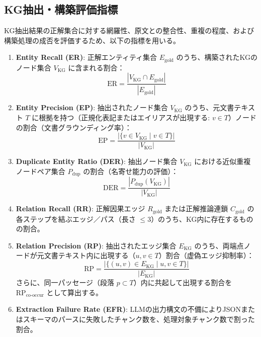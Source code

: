 \documentclass[a4j,dvipdfmx]{jsarticle}
\begin{document}
\subsection{KG抽出・構築評価指標}
KG抽出結果の正解集合に対する網羅性、原文との整合性、重複の程度、および構築処理の成否を評価するため、以下の指標を用いる。
\begin{enumerate}
    \item \textbf{Entity Recall (ER)}: 正解エンティティ集合 $E_{\text{gold}}$ のうち、構築されたKGのノード集合 $V_{\text{KG}}$ に含まれる割合：
    \begin{equation}
        \text{ER} = \frac{|V_{\text{KG}} \cap E_{\text{gold}}|}{|E_{\text{gold}}|}
    \end{equation}
    \item \textbf{Entity Precision (EP)}: 抽出されたノード集合 $V_{\text{KG}}$ のうち、元文書テキスト $T$ に根拠を持つ（正規化表記またはエイリアスが出現する: $v \in T$）ノードの割合（文書グラウンディング率）：
    \begin{equation}
        \text{EP} = \frac{|\{v \in V_{\text{KG}} \mid v \in T\}|}{|V_{\text{KG}}|}
    \end{equation}
    \item \textbf{Duplicate Entity Ratio (DER)}: 抽出ノード集合 $V_{\text{KG}}$ における近似重複ノードペア集合 $P_{\text{dup}}$ の割合（名寄せ能力の評価）：
    \begin{equation}
        \text{DER} = \frac{|P_{\text{dup}}(V_{\text{KG}})|}{|V_{\text{KG}}|}
    \end{equation}
    \item \textbf{Relation Recall (RR)}: 正解因果エッジ $R_{\text{gold}}$ または正解推論連鎖 $C_{\text{gold}}$ の各ステップを結ぶエッジ／パス（長さ $\le 3$）のうち、KG内に存在するものの割合。
    \item \textbf{Relation Precision (RP)}: 抽出されたエッジ集合 $E_{\text{KG}}$ のうち、両端点ノードが元文書テキスト内に出現する（$u, v \in T$）割合（虚偽エッジ抑制率）：
    \begin{equation}
        \text{RP} = \frac{|\{(u, v) \in E_{\text{KG}} \mid u, v \in T\}|}{|E_{\text{KG}}|}
    \end{equation}
    さらに、同一パッセージ（段落 $p \subset T$）内に共起して出現する割合を $\text{RP}_{\text{co-occur}}$ として算出する。
    \item \textbf{Extraction Failure Rate (EFR)}: LLMの出力構文の不備によりJSONまたはスキーマのパースに失敗したチャンク数を、処理対象チャンク数で割った割合。
\end{enumerate}
\end{document}

